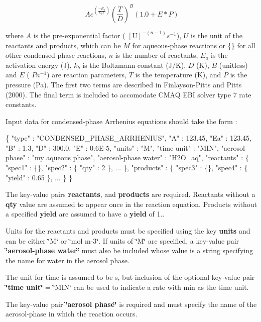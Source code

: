 \[ Ae^{(\frac{-E_a}{k_bT})}(\frac{T}{D})^B(1.0+E*P) \]

where $A$ is the pre-\/exponential factor ( $[\mbox{U}]^{-(n-1)} s^{-1}$), $U$ is the unit of the reactants and products, which can be $M$ for aqueous-\/phase reactions or \{\} for all other condensed-\/phase reactions, $n$ is the number of reactants, $E_a$ is the activation energy (J), $k_b$ is the Boltzmann constant (J/K), $D$ (K), $B$ (unitless) and $E$ ( $Pa^{-1}$) are reaction parameters, $T$ is the temperature (K), and $P$ is the pressure (Pa). The first two terms are described in Finlayson-\/\+Pitts and Pitts (2000). The final term is included to accomodate C\+M\+AQ E\+BI solver type 7 rate constants.

Input data for condensed-\/phase Arrhenius equations should take the form \+: 
\begin{DoxyCode}
\{
  "type" : "CONDENSED\_PHASE\_ARRHENIUS",
  "A" : 123.45,
  "Ea" : 123.45,
  "B"  : 1.3,
  "D"  : 300.0,
  "E"  : 0.6E-5,
  "units" : "M",
  "time unit" : "MIN",
  "aerosol phase" : "my aqueous phase",
  "aerosol-phase water" : "H2O\_aq",
  "reactants" : \{
    "spec1" : \{\},
    "spec2" : \{ "qty" : 2 \},
    ...
  \},
  "products" : \{
    "spec3" : \{\},
    "spec4" : \{ "yield" : 0.65 \},
    ...
  \}
\}
\end{DoxyCode}
 The key-\/value pairs {\bfseries reactants}, and {\bfseries products} are required. Reactants without a {\bfseries qty} value are assumed to appear once in the reaction equation. Products without a specified {\bfseries yield} are assumed to have a {\bfseries yield} of 1..

Units for the reactants and products must be specified using the key {\bfseries units} and can be either \char`\"{}\+M\char`\"{} or \char`\"{}mol m-\/3\char`\"{}. If units of \char`\"{}\+M\char`\"{} are specified, a key-\/value pair {\bfseries \char`\"{}aerosol-\/phase water\char`\"{}} must also be included whose value is a string specifying the name for water in the aerosol phase.

The unit for time is assumed to be s, but inclusion of the optional key-\/value pair {\bfseries \char`\"{}time unit\char`\"{}} = \char`\"{}\+M\+I\+N\char`\"{} can be used to indicate a rate with min as the time unit.

The key-\/value pair {\bfseries \char`\"{}aerosol phase\char`\"{}} is required and must specify the name of the aerosol-\/phase in which the reaction occurs.

